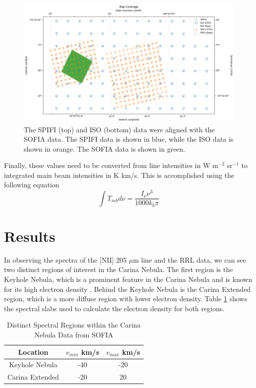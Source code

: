 \begin{figure}
    \centering
    \includegraphics[width=\textwidth]{figs/carina/fits_coverage.png}
    \caption[Aligned SPIFI and ISO Data with SOFIA Data]{
        The SPIFI (top) and ISO (bottom) data were aligned with the SOFIA data.
        The SPIFI data is shown in blue, while the ISO data is shown in orange.
        The SOFIA data is shown in green.
        }
    \label{carina/fig:aligned_fits}
\end{figure}

Finally, these values need to be converted from line intensities in W m$^{-2}$ sr$^{-1}$ to integrated main beam intensities in K km/s.
This is accomplished using the following equation \parencite{oberst2011205}
\begin{equation}
    \int{T_{mb} d\nu} = \frac{I_\nu \nu^3}{1000 k_b \pi}
\end{equation}

\section{Results}
In observing the spectra of the [NII] 205 $\mu$m line and the RRL data, we can see two distinct regions of interest in the Carina Nebula.
The first region is the Keyhole Nebula, which is a prominent feature in the Carina Nebula and is known for its high electron density \cite{brooks2000unlocking}.
Behind the Keyhole Nebula is the Carina Extended region, which is a more diffuse region with lower electron density.
Table \ref{carina/tab:slabs} shows the spectral slabs used to calculate the electron density for both regions.

\begin{table}
    \centering
    \begin{tabular}{|c|c|c|}
        \hline
        Location & $v_{min}$ km/s & $v_{max}$ km/s \\
        \hline
        Keyhole Nebula & -40 & -20 \\
        Carina Extended & -20 & 20 \\
        \hline
    \end{tabular}
    \caption{Distinct Spectral Regions within the Carina Nebula Data from SOFIA}
    \label{carina/tab:slabs}
\end{table}

